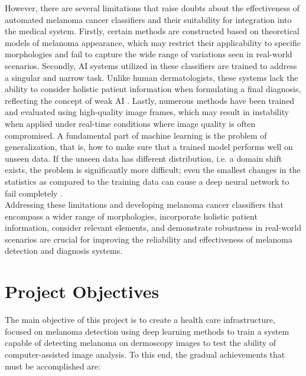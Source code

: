 However, there are several limitations that raise doubts about the
effectiveness of automated melanoma cancer classifiers and their suitability
for integration into the medical system. Firstly, certain methods are
constructed based on theoretical models of melanoma appearance, which may
restrict their applicability to specific morphologies and fail to capture the
wide range of variations seen in real-world scenarios. Secondly, AI systems
utilized in these classifiers are trained to address a singular and narrow
task. Unlike human dermatologists, these systems lack the ability to consider
holistic patient information when formulating a final diagnosis, reflecting the
concept of weak AI \cite{WeakAI}. Lastly, numerous methods have been trained
and evaluated using high-quality image frames, which may result in instability
when applied under real-time conditions where image quality is often
compromised. A fundamental part of machine learning is the problem of
generalization, that is, how to make sure that a trained model performs well on
unseen data. If the unseen data has different distribution, i.e. a domain shift
exists, the problem is significantly more difficult; even the smallest changes
in the statistics as compared to the training data can cause a deep neural
network to fail completely \cite{DomainShift}. \\

Addressing these limitations and developing melanoma cancer classifiers that
encompass a wider range of morphologies, incorporate holistic patient
information, consider relevant elements, and demonstrate robustness in
real-world scenarios are crucial for improving the reliability and
effectiveness of melanoma detection and diagnosis systems. \\

\section{Project Objectives}

The main objective of this project is to create a health care infrastructure,
focused on melanoma detection using deep learning methods to train a system
capable of detecting melanoma on dermoscopy images to test the ability of
computer-assisted image analysis. To this end, the gradual achievements that
must be accomplished are:

